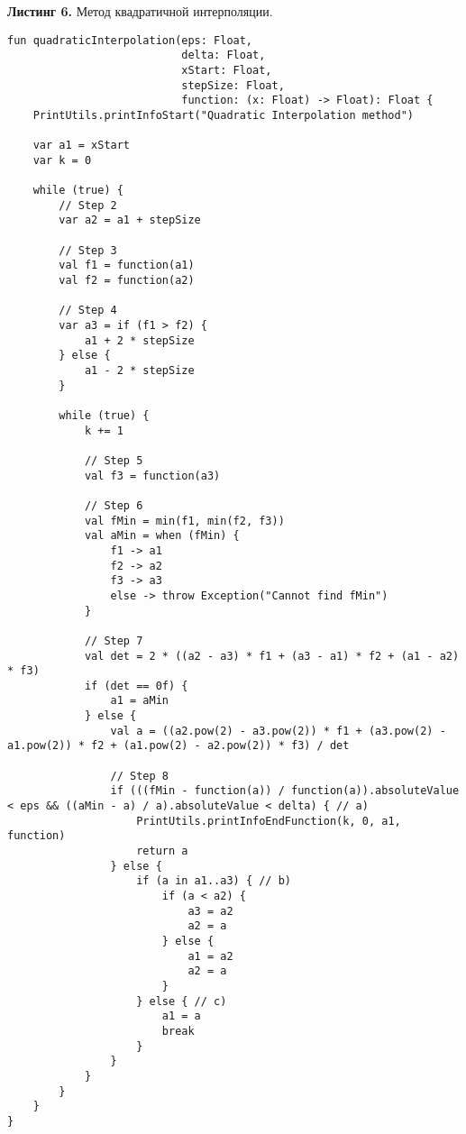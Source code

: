 \documentclass[a4paper, 12pt]{article}   	%
\begin{document}
    \textbf{Листинг 6.} Метод квадратичной интерполяции.
    \begin{verbatim}
fun quadraticInterpolation(eps: Float,
                           delta: Float,
                           xStart: Float,
                           stepSize: Float,
                           function: (x: Float) -> Float): Float {
    PrintUtils.printInfoStart("Quadratic Interpolation method")

    var a1 = xStart
    var k = 0

    while (true) {
        // Step 2
        var a2 = a1 + stepSize

        // Step 3
        val f1 = function(a1)
        val f2 = function(a2)

        // Step 4
        var a3 = if (f1 > f2) {
            a1 + 2 * stepSize
        } else {
            a1 - 2 * stepSize
        }

        while (true) {
            k += 1

            // Step 5
            val f3 = function(a3)

            // Step 6
            val fMin = min(f1, min(f2, f3))
            val aMin = when (fMin) {
                f1 -> a1
                f2 -> a2
                f3 -> a3
                else -> throw Exception("Cannot find fMin")
            }

            // Step 7
            val det = 2 * ((a2 - a3) * f1 + (a3 - a1) * f2 + (a1 - a2) * f3)
            if (det == 0f) {
                a1 = aMin
            } else {
                val a = ((a2.pow(2) - a3.pow(2)) * f1 + (a3.pow(2) - a1.pow(2)) * f2 + (a1.pow(2) - a2.pow(2)) * f3) / det

                // Step 8
                if (((fMin - function(a)) / function(a)).absoluteValue < eps && ((aMin - a) / a).absoluteValue < delta) { // a)
                    PrintUtils.printInfoEndFunction(k, 0, a1, function)
                    return a
                } else {
                    if (a in a1..a3) { // b)
                        if (a < a2) {
                            a3 = a2
                            a2 = a
                        } else {
                            a1 = a2
                            a2 = a
                        }
                    } else { // c)
                        a1 = a
                        break
                    }
                }
            }
        }
    }
}
    \end{verbatim}
\end{document}
